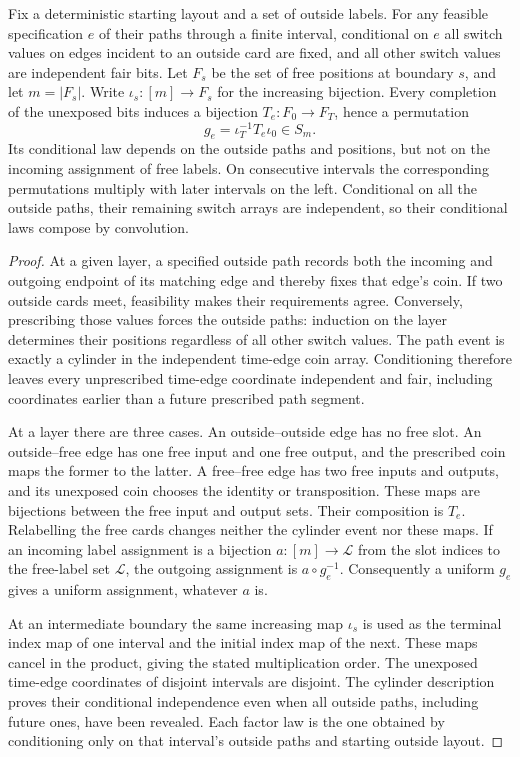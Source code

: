 \begin{lemma}\label{lem:slot-kernel}
Fix a deterministic starting layout and a set of outside labels. For any feasible specification $e$ of their paths through a finite interval, conditional on $e$ all switch values on edges incident to an outside card are fixed, and all other switch values are independent fair bits. Let $F_s$ be the set of free positions at boundary $s$, and let $m=|F_s|$. Write $\iota_s:[m]\to F_s$ for the increasing bijection. Every completion of the unexposed bits induces a bijection $T_e:F_0\to F_T$, hence a permutation
\[
 g_e=\iota_T^{-1}T_e\iota_0\in S_m.
\]
Its conditional law depends on the outside paths and positions, but not on the incoming assignment of free labels. On consecutive intervals the corresponding permutations multiply with later intervals on the left. Conditional on all the outside paths, their remaining switch arrays are independent, so their conditional laws compose by convolution.
\end{lemma}
\begin{proof}
At a given layer, a specified outside path records both the incoming and outgoing endpoint of its matching edge and thereby fixes that edge's coin. If two outside cards meet, feasibility makes their requirements agree. Conversely, prescribing those values forces the outside paths: induction on the layer determines their positions regardless of all other switch values. The path event is exactly a cylinder in the independent time-edge coin array. Conditioning therefore leaves every unprescribed time-edge coordinate independent and fair, including coordinates earlier than a future prescribed path segment.

At a layer there are three cases. An outside--outside edge has no free slot. An outside--free edge has one free input and one free output, and the prescribed coin maps the former to the latter. A free--free edge has two free inputs and outputs, and its unexposed coin chooses the identity or transposition. These maps are bijections between the free input and output sets. Their composition is $T_e$. Relabelling the free cards changes neither the cylinder event nor these maps. If an incoming label assignment is a bijection $a:[m]\to\mathcal L$ from the slot indices to the free-label set $\mathcal L$, the outgoing assignment is $a\circ g_e^{-1}$. Consequently a uniform $g_e$ gives a uniform assignment, whatever $a$ is.

At an intermediate boundary the same increasing map $\iota_s$ is used as the terminal index map of one interval and the initial index map of the next. These maps cancel in the product, giving the stated multiplication order. The unexposed time-edge coordinates of disjoint intervals are disjoint. The cylinder description proves their conditional independence even when all outside paths, including future ones, have been revealed. Each factor law is the one obtained by conditioning only on that interval's outside paths and starting outside layout.
\end{proof}

